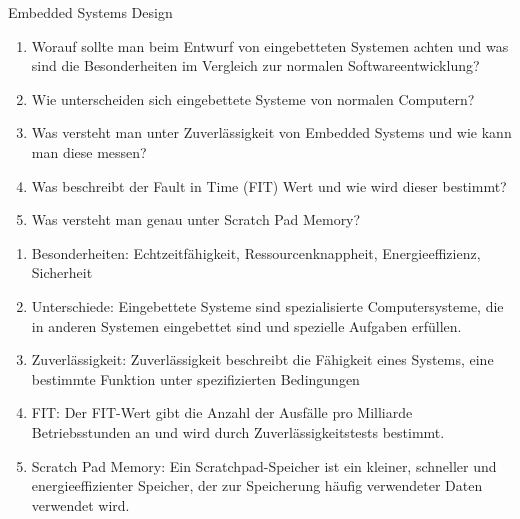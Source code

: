 \documentclass{article}
\author{Leopold Lemmermann}
\begin{document}
\createtitle

\begin{exercise}{Embedded Systems Design}
  \begin{enumerate}
    \item Worauf sollte man beim Entwurf von eingebetteten Systemen achten und was sind die Besonderheiten im Vergleich zur normalen Softwareentwicklung?
    \item Wie unterscheiden sich eingebettete Systeme von normalen Computern?
    \item Was versteht man unter Zuverlässigkeit von Embedded Systems und wie kann man diese messen?
    \item Was beschreibt der Fault in Time (FIT) Wert und wie wird dieser bestimmt?
    \item Was versteht man genau unter Scratch Pad Memory?
  \end{enumerate}

  \begin{solution}
    \begin{enumerate}
      \item Besonderheiten: Echtzeitfähigkeit, Ressourcenknappheit, Energieeffizienz, Sicherheit
      \item Unterschiede: Eingebettete Systeme sind spezialisierte Computersysteme, die in anderen Systemen eingebettet sind und spezielle Aufgaben erfüllen.
      \item Zuverlässigkeit: Zuverlässigkeit beschreibt die Fähigkeit eines Systems, eine bestimmte Funktion unter spezifizierten Bedingungen
      \item FIT: Der FIT-Wert gibt die Anzahl der Ausfälle pro Milliarde Betriebsstunden an und wird durch Zuverlässigkeitstests bestimmt.
      \item Scratch Pad Memory: Ein Scratchpad-Speicher ist ein kleiner, schneller und energieeffizienter Speicher, der zur Speicherung häufig verwendeter Daten verwendet wird.
    \end{enumerate}
  \end{solution}
\end{exercise}
\end{document}
